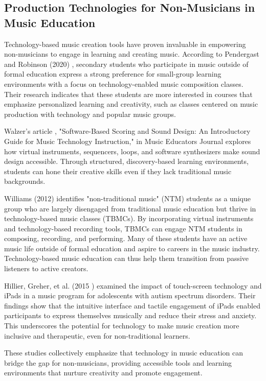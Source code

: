 \documentclass[10pt,twocolumn]{article}
\begin{document}
\subsection{Production Technologies for Non-Musicians in Music Education}
Technology-based music creation tools have proven invaluable in empowering non-musicians to engage in learning and creating music. According to Pendergast and Robinson (2020) \cite{pendergast_secondary_2020}, secondary students who participate in music outside of formal education express a strong preference for small-group learning environments with a focus on technology-enabled music composition classes. Their research indicates that these students are more interested in courses that emphasize personalized learning and creativity, such as classes centered on music production with technology and popular music groups.

Walzer's article \cite{walzer_software-based_2016}, "Software-Based Scoring and Sound Design: An Introductory Guide for Music Technology Instruction," in Music Educators Journal explores how virtual instruments, sequencers, loops, and software synthesizers make sound design accessible. Through structured, discovery-based learning environments, students can hone their creative skills even if they lack traditional music backgrounds.

Williams (2012) \cite{williams_non-traditional_2012} identifies "non-traditional music" (NTM) students as a unique group who are largely disengaged from traditional music education but thrive in technology-based music classes (TBMCs). By incorporating virtual instruments and technology-based recording tools, TBMCs can engage NTM students in composing, recording, and performing. Many of these students have an active music life outside of formal education and aspire to careers in the music industry. Technology-based music education can thus help them transition from passive listeners to active creators.

Hillier, Greher, et al. (2015 )\cite{hillier_music_2015} examined the impact of touch-screen technology and iPads in a music program for adolescents with autism spectrum disorders. Their findings show that the intuitive interface and tactile engagement of iPads enabled participants to express themselves musically and reduce their stress and anxiety. This underscores the potential for technology to make music creation more inclusive and therapeutic, even for non-traditional learners.

These studies collectively emphasize that technology in music education can bridge the gap for non-musicians, providing accessible tools and learning environments that nurture creativity and promote engagement.
\end{document}
